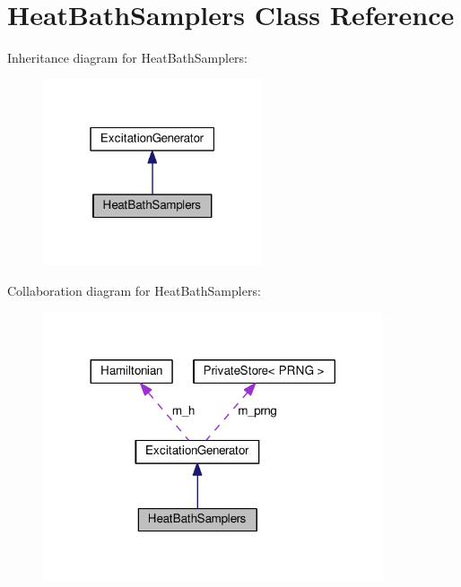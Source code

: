 \hypertarget{classHeatBathSamplers}{}\section{Heat\+Bath\+Samplers Class Reference}
\label{classHeatBathSamplers}


Inheritance diagram for Heat\+Bath\+Samplers\+:
\nopagebreak
\begin{figure}[H]
\begin{center}
\leavevmode
\includegraphics[width=183pt]{classHeatBathSamplers__inherit__graph}
\end{center}
\end{figure}


Collaboration diagram for Heat\+Bath\+Samplers\+:
\nopagebreak
\begin{figure}[H]
\begin{center}
\leavevmode
\includegraphics[width=284pt]{classHeatBathSamplers__coll__graph}
\end{center}
\end{figure}
